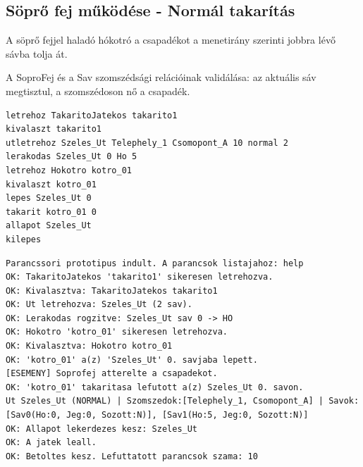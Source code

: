 \subsection{Söprő fej működése - Normál takarítás}
\begin{test-case-description}
    A söprő fejjel haladó hókotró a csapadékot a menetirány szerinti jobbra lévő sávba tolja át.
\end{test-case-description}
\begin{test-case-function}
    A SoproFej és a Sav szomszédsági relációinak validálása: az aktuális sáv megtisztul, a szomszédoson nő a csapadék.
\end{test-case-function}
\begin{test-case-input}
\begin{verbatim}
letrehoz TakaritoJatekos takarito1
kivalaszt takarito1
utletrehoz Szeles_Ut Telephely_1 Csomopont_A 10 normal 2
lerakodas Szeles_Ut 0 Ho 5
letrehoz Hokotro kotro_01
kivalaszt kotro_01
lepes Szeles_Ut 0
takarit kotro_01 0
allapot Szeles_Ut
kilepes
\end{verbatim}
\end{test-case-input}
\begin{test-case-output}
\begin{verbatim}
Parancssori prototipus indult. A parancsok listajahoz: help
OK: TakaritoJatekos 'takarito1' sikeresen letrehozva.
OK: Kivalasztva: TakaritoJatekos takarito1
OK: Ut letrehozva: Szeles_Ut (2 sav).
OK: Lerakodas rogzitve: Szeles_Ut sav 0 -> HO
OK: Hokotro 'kotro_01' sikeresen letrehozva.
OK: Kivalasztva: Hokotro kotro_01
OK: 'kotro_01' a(z) 'Szeles_Ut' 0. savjaba lepett.
[ESEMENY] Soprofej atterelte a csapadekot.
OK: 'kotro_01' takaritasa lefutott a(z) Szeles_Ut 0. savon.
Ut Szeles_Ut (NORMAL) | Szomszedok:[Telephely_1, Csomopont_A] | Savok: [Sav0(Ho:0, Jeg:0, Sozott:N)], [Sav1(Ho:5, Jeg:0, Sozott:N)]
OK: Allapot lekerdezes kesz: Szeles_Ut
OK: A jatek leall.
OK: Betoltes kesz. Lefuttatott parancsok szama: 10
\end{verbatim}
\end{test-case-output}

